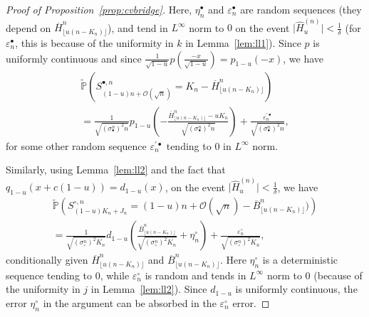 \documentclass[AHL,XML,longabstracts,Unicode]{cedram}
\def\scn{\sigma_{\circ}^{n}}
\def\sbn{\sigma_{\bullet}^{n}}
\def\Sbn{S^{\bullet,n}}
\def\Scn{S^{\circ,n}}
\def\oB{\overline{B}}
\def\oH{\overline{H}}
\def\hH{\widehat{H}}
\renewcommand{\epsilon}{\varepsilon}
\newcommand\tPr[1]{\tilde{\mathbb{P}}\left(#1\right)}
\begin{document}
\begin{proof}[Proof of Proposition~\ref{prop:cvbridge}]
Here, $\eta^{\bullet}_{n}$ and $\epsilon^{\bullet}_{n}$ are random sequences
(they depend on $\oH^{n}_{ \lfloor u (n-K_{n}) \rfloor}$),
and tend in $L^\infty$ norm to $0$
on the event $ \big| \hH^{(n)}_{u} \big| < \tfrac{1}{\delta}$
(for $\epsilon^{\bullet}_{n}$, this is because of the uniformity in $k$ in Lemma~\ref{lem:ll1}).
Since $p$ is uniformly continuous
and since $\tfrac{1}{\sqrt{1-u}}p(\tfrac{-x}{\sqrt{1-u}})=p_{1-u}(-x)$,
we have
\begin{multline}
  \tPr{\Sbn_{(1-u)n+\mathcal O(\sqrt{n})}=K_{n}-\oH^{n}_{ \lfloor u (n-K_{n}) \rfloor}}\\
=\frac{1}{\sqrt{ (\sbn)^{2}  n} }p_{1-u}\left( -\frac{\oH^{n}_{ \lfloor u (n-K_{n}) \rfloor }
- u K_{n}}{ \sqrt{ (\sbn)^{2} n} }\right) + \frac{\epsilon^{'\bullet}_{n}}{\sqrt{ (\sbn)^{2}  n}},
\label{eq:PSbn}
\end{multline}
for some other random sequence $\epsilon^{'\bullet}_{n}$ tending to $0$ in $L^\infty$ norm.


Similarly, using Lemma~\ref{lem:ll2} and the fact that  $q_{1-u}(x+c(1-u))=d_{1-u}(x)$,
on the event $ \big| \hH^{(n)}_{u} \big| < \tfrac{1}{\delta}$,
we have
\begin{multline}
\tPr{\Scn_{(1-u) K_{n}+ J_{n}}= (1-u)n+\mathcal O(\sqrt{n})-\oB^{n}_{\lfloor u (n-K_{n}) \rfloor})}\\
   =  \frac{1}{ \sqrt{ (\scn)^{2} K_{n} } } d_{1-u} \left( \frac{\oB^{n}_{\lfloor u (n-K_{n}) \rfloor}}{\sqrt{ (\scn)^{2} K_{n} }}+ \eta^{\circ}_{n}\right)+  \frac{\epsilon^{\circ}_{n}}{\sqrt{ (\scn)^{2}  K_n}},
   \label{eq:PScn}
\end{multline}
conditionally given $\oH^{n}_{ \lfloor u (n-K_{n}) \rfloor }$ and $\oB^{n}_{ \lfloor u (n-K_{n}) \rfloor }$.
Here $\eta^{\circ}_{n}$ is a deterministic sequence tending to $0$,
while $\epsilon^{\circ}_{n}$ is random and tends in $L^\infty$ norm to $0$
(because of the uniformity in $j$ in Lemma~\ref{lem:ll2}).
Since $d_{1-u}$ is uniformly continuous, the error $\eta^{\circ}_{n}$ in the argument
can be absorbed in the $\epsilon^{\circ}_{n}$ error.


\end{proof}
\end{document}
